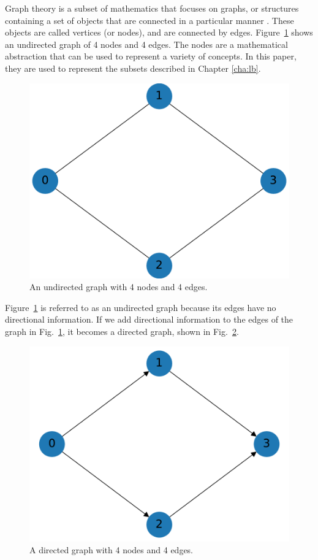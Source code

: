 \documentclass[times,final]{elsarticle}
\begin{document}
Graph theory is a subset of mathematics that focuses on graphs, or structures containing a set of objects that are connected in a particular manner \cite{graphtheory}.
These objects are called vertices (or nodes), and are connected by edges.
Figure~\ref{basic_graph} shows an undirected graph of 4 nodes and 4 edges. The nodes are a mathematical abstraction that can be used to represent a variety of concepts. In this paper, they are used to represent the subsets described in Chapter \ref{cha:lb}.
\begin{figure}[H]
\centering
\includegraphics[scale=0.5]{../figures/undirected_graph.pdf}
\caption{An undirected graph with 4 nodes and 4 edges. }
\label{basic_graph}
\end{figure}
Figure~\ref{basic_graph} is referred to as an undirected graph because its edges have no directional information.
If we add directional information to the edges of the graph in Fig.~\ref{basic_graph}, it becomes a directed graph, shown in Fig.~\ref{directed_graph}.
\begin{figure}[H]
\centering
\includegraphics[scale=0.5]{../figures/directed_graph.pdf}
\caption{A directed graph with 4 nodes and 4 edges. }
\label{directed_graph}
\end{figure}
\end{document}
